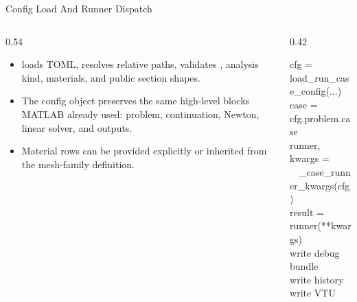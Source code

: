 \documentclass[aspectratio=169,10pt]{beamer}
\begin{document}
\begin{frame}{Config Load And Runner Dispatch}
\small
\begin{columns}[T,totalwidth=\textwidth]
\begin{column}{0.54\textwidth}
\begin{softbox}
\begin{itemize}
  \item {} loads TOML, resolves relative paths, validates , analysis kind, materials, and public section shapes.
  \item The config object preserves the same high-level blocks MATLAB already used: problem, continuation, Newton, linear solver, and outputs.
  \item Material rows can be provided explicitly or inherited from the mesh-family definition.
\end{itemize}
\end{softbox}
\end{column}
\begin{column}{0.42\textwidth}
\begin{pseudobox}
cfg = load\_run\_case\_config(...)\\
case = cfg.problem.case\\
runner, kwargs =\\
\ \ \_case\_runner\_kwargs(cfg)\\
result = runner(**kwargs)\\
write debug bundle\\
write history\\
write VTU
\end{pseudobox}
\end{column}
\end{columns}
\end{frame}
\end{document}
